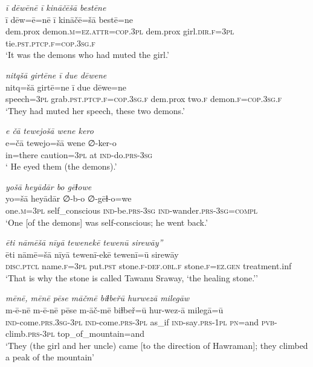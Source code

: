 \ea \label{ŽP.177}
\textit{ī dēwēnē ī kināčēšā bestēne} \\ 
\gll ī dēw=ē=nē ī kināčē=šā bestē=ne \\ 
 dem.prox demon\textsc{.m}\textsc{=ez}.\textsc{attr}\textsc{=cop}\textsc{.3pl} dem.prox girl\textsc{.dir}\textsc{.f}\textsc{=3pl} tie\textsc{.pst}\textsc{.ptcp}\textsc{.f}\textsc{=cop}\textsc{.3sg}\textsc{.f} \\ 
\glt `It was the demons who had muted the girl.'
\z 
 
\ea \label{ŽP.178}
\textit{nitqšā girtēne ī due dēwene} \\ 
\gll nitq=šā girtē=ne ī due dēwe=ne \\ 
 speech\textsc{=3pl} grab\textsc{.pst}\textsc{.ptcp}\textsc{.f}\textsc{=cop}\textsc{.3sg}\textsc{.f} dem.prox two\textsc{.f} demon\textsc{.f}\textsc{=cop}\textsc{.3sg}\textsc{.f} \\ 
\glt `They had muted her speech, these two demons.'
\z 
 
\ea \label{ŽP.179}
\textit{e čā tewejošā wene kero} \\ 
\gll e=čā tewejo=šā wene ∅-ker-o \\ 
 in=there caution\textsc{=3pl} at \textsc{ind-}do\textsc{.prs}\textsc{-3sg} \\ 
\glt ` He eyed them (the demons).'
\z 
 
\ea \label{ŽP.180}
\textit{yošā heyādār bo gēɫowe} \\ 
\gll yo=šā heyādār ∅-b-o ∅-gēɫ-o=we \\ 
 one\textsc{.m}\textsc{=3pl} self\_conscious \textsc{ind-}be\textsc{.prs}\textsc{-3sg} \textsc{ind-}wander\textsc{.prs}\textsc{-3sg}\textsc{=compl} \\ 
\glt `One [of the demons] was self-conscious; he went back.'
\z 
 
\ea \label{ŽP.185}
\textit{ēti nāmēšā nīyā tewenekē tewenū sirewāy”} \\ 
\gll ēti nāmē=šā nīyā tewenī-ekē tewenī=ū sirewāy \\ 
 \textsc{disc.ptcl} name\textsc{.f}\textsc{=3pl} put\textsc{.pst} stone\textsc{.f}\textsc{-def}\textsc{.obl}\textsc{.f} stone\textsc{.f}\textsc{\textsc{=ez.gen}} treatment.inf \\ 
\glt `That is why the stone is called Tawanu Sraway, ‘the healing stone.’'
\z 
 
\ea \label{ŽP.186}
\textit{mēnē, mēnē pēse māčmē biɫbeřū hurwezā milegāw} \\ 
\gll m-ē-nē m-ē-nē pēse m-āč-mē biɫbeř=ū hur-wez-ā milegā=ū \\ 
 \textsc{ind-}come\textsc{.prs}\textsc{.3sg}\textsc{-3pl} \textsc{ind-}come\textsc{.prs}\textsc{-3pl} as\_if \textsc{ind-}say\textsc{.prs}\textsc{-1pl} \textsc{pn}=and \textsc{pvb-}climb\textsc{.prs}\textsc{-3pl} top\_of\_mountain=and \\ 
\glt `They (the girl and her uncle) came [to the direction of Hawraman]; they climbed a peak of the mountain'
\z 
 
